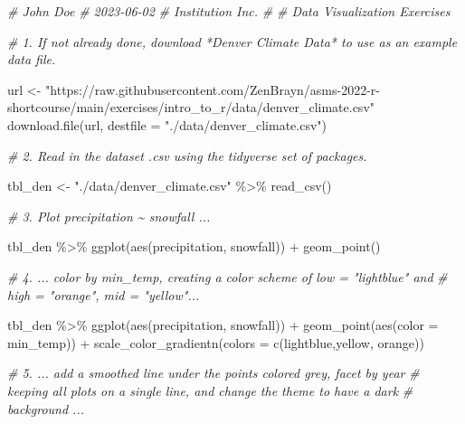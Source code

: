 \documentclass[
]{book}
\newenvironment{Shaded}{\begin{snugshade}}{\end{snugshade}}
\newcommand{\AttributeTok}[1]{\textcolor[rgb]{0.77,0.63,0.00}{#1}}
\newcommand{\CommentTok}[1]{\textcolor[rgb]{0.56,0.35,0.01}{\textit{#1}}}
\newcommand{\FunctionTok}[1]{\textcolor[rgb]{0.00,0.00,0.00}{#1}}
\newcommand{\NormalTok}[1]{#1}
\newcommand{\OtherTok}[1]{\textcolor[rgb]{0.56,0.35,0.01}{#1}}
\newcommand{\SpecialCharTok}[1]{\textcolor[rgb]{0.00,0.00,0.00}{#1}}
\newcommand{\StringTok}[1]{\textcolor[rgb]{0.31,0.60,0.02}{#1}}
\begin{document}
\begin{Shaded}
\begin{Highlighting}[]
\CommentTok{\# John Doe}
\CommentTok{\# 2023{-}06{-}02}
\CommentTok{\# Institution Inc.}
\CommentTok{\#}
\CommentTok{\# Data Visualization Exercises}

\CommentTok{\# 1. If not already done, download *Denver Climate Data* to use as an example data file.}

\NormalTok{url }\OtherTok{\textless{}{-}} \StringTok{"https://raw.githubusercontent.com/ZenBrayn/asms{-}2022{-}r{-}shortcourse/main/exercises/intro\_to\_r/data/denver\_climate.csv"}
\FunctionTok{download.file}\NormalTok{(url, }\AttributeTok{destfile =} \StringTok{"./data/denver\_climate.csv"}\NormalTok{)}


\CommentTok{\# 2. Read in the dataset .csv using the \textasciigrave{}tidyverse\textasciigrave{} set of packages.}

\NormalTok{tbl\_den }\OtherTok{\textless{}{-}} \StringTok{"./data/denver\_climate.csv"} \SpecialCharTok{\%\textgreater{}\%} \FunctionTok{read\_csv}\NormalTok{()}


\CommentTok{\# 3. Plot precipitation \textasciitilde{} snowfall ...}

\NormalTok{tbl\_den }\SpecialCharTok{\%\textgreater{}\%} 
  \FunctionTok{ggplot}\NormalTok{(}\FunctionTok{aes}\NormalTok{(precipitation, snowfall)) }\SpecialCharTok{+} 
  \FunctionTok{geom\_point}\NormalTok{()}


\CommentTok{\# 4. ... color by \textasciigrave{}min\_temp\textasciigrave{}, creating a color scheme of low = "lightblue" and }
\CommentTok{\#    high = "orange", mid = "yellow"...}

\NormalTok{tbl\_den }\SpecialCharTok{\%\textgreater{}\%} 
  \FunctionTok{ggplot}\NormalTok{(}\FunctionTok{aes}\NormalTok{(precipitation, snowfall)) }\SpecialCharTok{+} 
  \FunctionTok{geom\_point}\NormalTok{(}\FunctionTok{aes}\NormalTok{(}\AttributeTok{color =}\NormalTok{ min\_temp)) }\SpecialCharTok{+}
  \FunctionTok{scale\_color\_gradientn}\NormalTok{(}\AttributeTok{colors =} \FunctionTok{c}\NormalTok{(}\StringTok{\textquotesingle{}lightblue\textquotesingle{}}\NormalTok{,}\StringTok{\textquotesingle{}yellow\textquotesingle{}}\NormalTok{, }\StringTok{\textquotesingle{}orange\textquotesingle{}}\NormalTok{))}


\CommentTok{\# 5. ... add a smoothed line under the points colored grey, facet by \textasciigrave{}year\textasciigrave{} }
\CommentTok{\#    keeping all plots on a single line, and change the theme to have a dark }
\CommentTok{\#    background ...}


\end{Highlighting}
\end{Shaded}
\end{document}
